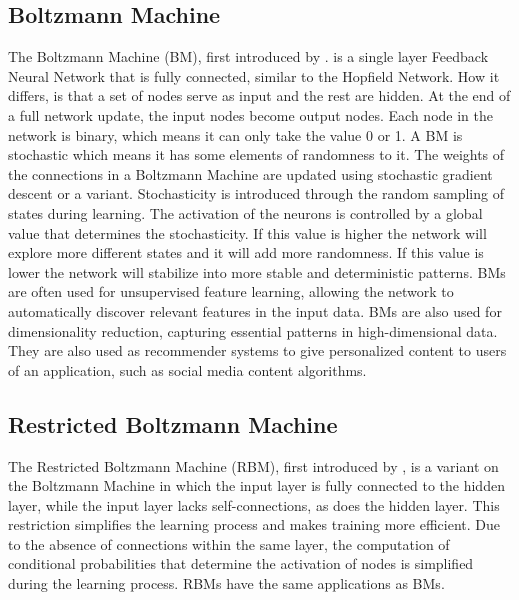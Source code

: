 \documentclass[conference]{IEEEtran}
\begin{document}
\subsection{Boltzmann Machine} \label{BM}
The Boltzmann Machine (BM), first introduced by \cite{hinton1986learning}. is a single layer Feedback Neural Network that is fully connected, similar to the Hopfield Network. How it differs, is that a set of nodes serve as input and the rest are hidden. At the end of a full network update, the input nodes become output nodes. Each node in the network is binary, which means it can only take the value 0 or 1. A BM is stochastic which means it has some elements of randomness to it. The weights of the connections in a Boltzmann Machine are updated using stochastic gradient descent or a variant. Stochasticity is introduced through the random sampling of states during learning. The activation of the neurons is controlled by a global value that determines the stochasticity. If this value is higher the network will explore more different states and it will add more randomness. If this value is lower the network will stabilize into more stable and deterministic patterns. BMs are often used for unsupervised feature learning, allowing the network to automatically discover relevant features in the input data. BMs are also used for dimensionality reduction, capturing essential patterns in high-dimensional data. They are also used as recommender systems to give personalized content to users of an application, such as social media content algorithms.

\subsection{Restricted Boltzmann Machine} \label{RBM}
The Restricted Boltzmann Machine (RBM), first introduced by \cite{smolensky1986information}, is a variant on the Boltzmann Machine in which the input layer is fully connected to the hidden layer, while the input layer lacks self-connections, as does the hidden layer. This restriction simplifies the learning process and makes training more efficient. Due to the absence of connections within the same layer, the computation of conditional probabilities that determine the activation of nodes is simplified during the learning process. RBMs have the same applications as BMs.
\end{document}
